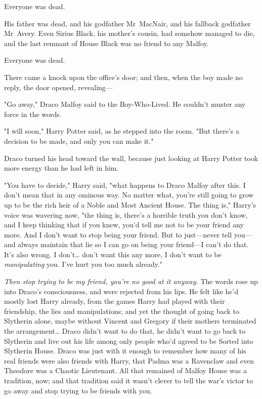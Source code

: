 Everyone was dead.

His father was dead, and his godfather Mr~MacNair, and his fallback godfather
Mr~Avery. Even Sirius Black, his mother's cousin, had somehow managed to die,
and the last remnant of House Black was no friend to any Malfoy.

Everyone was dead.

There came a knock upon the office's door; and then, when the boy made no
reply, the door opened, revealing---

"Go away," Draco Malfoy said to the Boy-Who-Lived. He couldn't muster any force
in the words.

"I will soon," Harry Potter said, as he stepped into the room. "But there's a
decision to be made, and only you can make it."

Draco turned his head toward the wall, because just looking at Harry Potter
took more energy than he had left in him.

"You have to decide," Harry said, "what happens to Draco Malfoy after this. I
don't mean that in any ominous way. No matter what, you're still going to grow
up to be the rich heir of a Noble and Most Ancient House. The thing is,"
Harry's voice was wavering now, "the thing is, there's a horrible truth you
don't know, and I keep thinking that if you knew, you'd tell me not to be your
friend any more. And I don't want to stop being your friend. But to just---never
tell you---and always maintain that lie so I can go on being your friend---I
can't do that. It's also wrong. I don't{\ldots} don't want this any more, I
don't want to be \emph{manipulating} you. I've hurt you too much already."

\emph{Then stop trying to be my friend, you're no good at it anyway.} The words
rose up into Draco's consciousness, and were rejected from his lips. He felt
like he'd mostly lost Harry already, from the games Harry had played with their
friendship, the lies and manipulations; and yet the thought of going back to
Slytherin alone, maybe without Vincent and Gregory if their mothers terminated
the arrangement{\ldots} Draco didn't want to do that, he didn't want to go back
to Slytherin and live out his life among only people who'd agreed to be Sorted
into Slytherin House. Draco was just with it enough to remember how many of
his real friends were also friends with Harry, that Padma was a Ravenclaw and
even Theodore was a Chaotic Lieutenant. All that remained of Malfoy House was a
tradition, now; and that tradition said it wasn't clever to tell the war's
victor to go away and stop trying to be friends with you.

